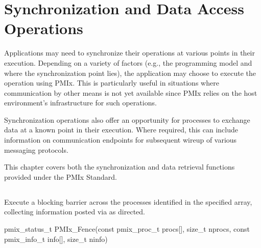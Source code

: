 \chapter{Synchronization and Data Access Operations}
\label{chap:api_sync_acc}

Applications may need to synchronize their operations at various points in
their execution. Depending on a variety of factors (e.g., the programming
model and where the synchronization point lies), the application may choose to
execute the operation using \ac{PMIx}. This is particularly useful in
situations where communication by other means is not yet available since
\ac{PMIx} relies on the host environment's infrastructure for such operations.

Synchronization operations also offer an opportunity for processes to exchange
data at a known point in their execution. Where required, this can include
information on communication endpoints for subsequent wireup of various
messaging protocols.

This chapter covers both the synchronization and data retrieval functions
provided under the \ac{PMIx} Standard.

\section{}

\summary

Execute a blocking barrier across the processes identified in the specified array, collecting information posted via  as directed.

\format

\cspecificstart
\begin{codepar}
pmix_status_t
PMIx_Fence(const pmix_proc_t procs[], size_t nprocs,
           const pmix_info_t info[], size_t ninfo)
\end{codepar}
\cspecificend

\begin{arglist}
\end{arglist}

